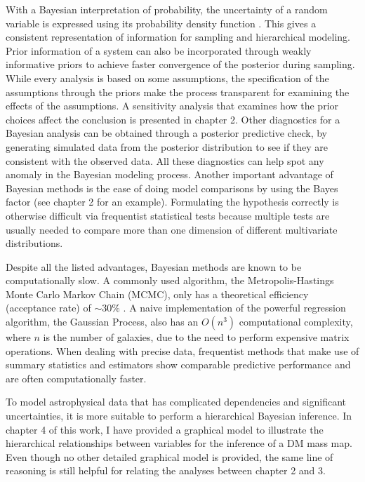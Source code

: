 With a Bayesian interpretation of probability, the uncertainty of a random variable 
is expressed using its probability density function \citep{Gelman13}. This
gives a consistent representation of information for sampling and 
hierarchical modeling. Prior information of a system can also be incorporated
through weakly informative priors to achieve faster convergence of the
posterior during sampling. 
While every analysis is based on some assumptions, the
specification of the assumptions through the priors make the process 
transparent for examining the effects of the assumptions.  
A sensitivity analysis that examines how the prior choices
affect the conclusion is presented in chapter 2. 
Other diagnostics for a Bayesian analysis
can be obtained through a posterior predictive check, by generating simulated 
data from the posterior 
distribution to see if they are consistent 
with the observed data. All these diagnostics can help spot any anomaly in
the Bayesian modeling process. Another important advantage of Bayesian
methods is the ease of doing model comparisons by using the Bayes factor (see
chapter 2 for an example).
Formulating the hypothesis correctly is 
otherwise difficult via frequentist statistical tests because 
multiple tests are usually needed to compare more than one dimension of different
multivariate distributions.  

Despite all the listed advantages, Bayesian methods are known to be
computationally slow. A commonly used algorithm, the Metropolis-Hastings Monte 
Carlo Markov Chain (MCMC), only has a theoretical efficiency
(acceptance rate) of $\sim 30\%$ \citep{Roberts97}. A naive implementation of the 
powerful regression algorithm,
the Gaussian Process, also has an $O(n^3)$ computational complexity, where $n$
is the number of galaxies, due to the need
to perform expensive matrix operations. When dealing with precise data,
frequentist methods that make use of summary statistics and estimators show
comparable predictive performance and are often computationally faster. 

To model astrophysical data that has complicated dependencies and significant 
uncertainties, it is more suitable to perform a hierarchical Bayesian inference. 
In chapter 4 of this work, I have provided a graphical model 
to illustrate the hierarchical relationships between variables for the
inference of a DM mass map.
Even though no other detailed graphical model is provided, 
the same line of reasoning is still helpful for 
relating the analyses between chapter 2 and 3.  

